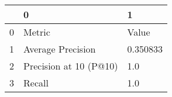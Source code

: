 \begin{tabular}{lll}
\toprule
{} &                       0 &         1 \\
\midrule
0 &                  Metric &     Value \\
1 &       Average Precision &  0.350833 \\
2 &  Precision at 10 (P@10) &       1.0 \\
3 &                  Recall &       1.0 \\
\bottomrule
\end{tabular}
